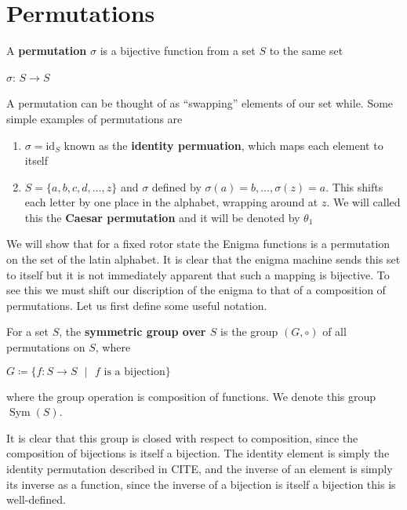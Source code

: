 \chapter{Permutations}

\begin{definition}
  A \textbf{permutation} $\sigma$ is a bijective function from a set $S$ to
  the same set
  \begin{center}
    $\sigma$: $S\to S$
  \end{center}
\end{definition}

A permutation can be thought of as ``swapping'' elements of our set
while. Some simple examples
of permutations are
\begin{example}
  \text{}
  \begin{enumerate}
    \item$\sigma = \text{id}_S$ known as the \textbf{identity
      permuation}, which maps each element to itself
    \item$S = \{a, b, c, d, \dots, z\}$ and $\sigma$ defined by
      $\sigma(a) = b, \dots, \sigma(z) = a$. This shifts
      each letter by one place in the alphabet, wrapping around at
      $z$. We will called this the \textbf{Caesar permutation} and it
      will be denoted by
      $\theta_1$
  \end{enumerate}
\end{example}

We will show that for a fixed rotor state the Enigma functions is a
permutation on the set of the latin alphabet.
It is clear that the enigma machine sends this set to itself but it
is not immediately apparent that such a mapping is bijective. To see this
we must shift our discription of the enigma to that of a composition
of permutations. Let us first define some useful notation.

\begin{definition}
  For a set $S$, the \textbf{symmetric group over $S$} is the group
  $(G,\circ)$ of all permutations on $S$, where
  \begin{center}
    $G\coloneq\{f: S\to S\text{ }\vert\text{ }f\text{ is a bijection}\}$
  \end{center}
  where the group operation is composition of functions. We denote
  this group $\operatorname{Sym}(S)$.
\end{definition}

It is clear that this group is closed with respect to composition,
since the composition of bijections is itself a bijection. The
identity element is simply the identity permutation described in CITE, and
the inverse of an element is simply its inverse as a function, since
the inverse of a bijection is itself a bijection this is well-defined.

